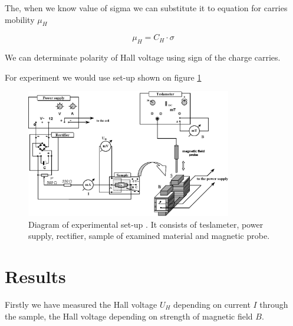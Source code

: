 \documentclass[a4paper,12pt]{article}
\begin{document}
    The, when we know value of sigma we can substitute it to equation for carries mobility $\mu_H$

    \begin{equation}
        \mu_H = C_H \cdot \sigma \label{eq:mu} 
    \end{equation}
    
    We can determinate polarity of Hall voltage using sign of the charge carries.
    
    For experiment we would use set-up shown on figure \ref{fig:set-up} 

    \begin{figure}[H]
    \begin{center}
        \includegraphics[width=0.8\textwidth]{set-up}
        \caption{Diagram of experimental set-up \cite{E22}. It consists of teslameter, power supply, rectifier, sample of examined material and magnetic probe.}
        \label{fig:set-up}
    \end{center}
    \end{figure}

    \section{Results}
    Firstly we have measured the Hall voltage $U_H$ depending on current $I$ through the sample, the Hall voltage depending on strength of magnetic field $B$.
    
\end{document}
